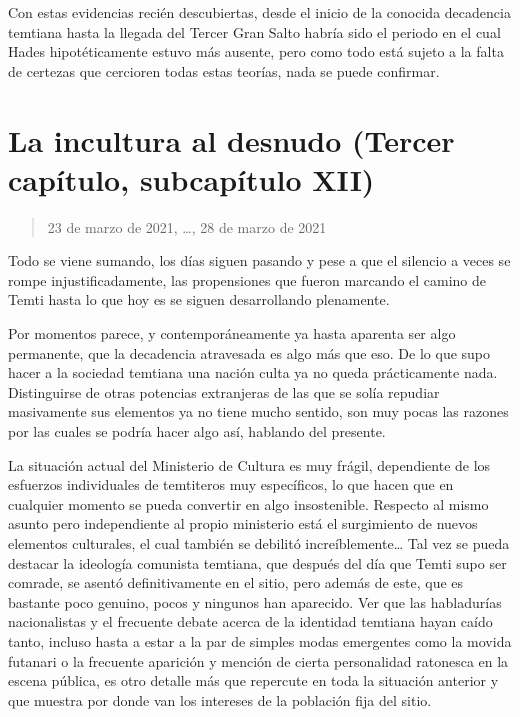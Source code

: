 \documentclass[
  spanish,
]{book}
\begin{document}
Con estas evidencias recién descubiertas, desde el inicio de la conocida decadencia temtiana hasta la llegada del Tercer Gran Salto habría sido el periodo en el cual Hades hipotéticamente estuvo más ausente, pero como todo está sujeto a la falta de certezas que cercioren todas estas teorías, nada se puede confirmar.

\hypertarget{la-incultura-al-desnudo-tercer-capuxedtulo-subcapuxedtulo-xii}{%
\section{La incultura al desnudo (Tercer capítulo, subcapítulo XII)}\label{la-incultura-al-desnudo-tercer-capuxedtulo-subcapuxedtulo-xii}}

\begin{quote}
23 de marzo de 2021, \ldots, 28 de marzo de 2021
\end{quote}

Todo se viene sumando, los días siguen pasando y pese a que el silencio a veces se rompe injustificadamente, las propensiones que fueron marcando el camino de Temti hasta lo que hoy es se siguen desarrollando plenamente.

Por momentos parece, y contemporáneamente ya hasta aparenta ser algo permanente, que la decadencia atravesada es algo más que eso. De lo que supo hacer a la sociedad temtiana una nación culta ya no queda prácticamente nada. Distinguirse de otras potencias extranjeras de las que se solía repudiar masivamente sus elementos ya no tiene mucho sentido, son muy pocas las razones por las cuales se podría hacer algo así, hablando del presente.

La situación actual del Ministerio de Cultura es muy frágil, dependiente de los esfuerzos individuales de temtiteros muy específicos, lo que hacen que en cualquier momento se pueda convertir en algo insostenible. Respecto al mismo asunto pero independiente al propio ministerio está el surgimiento de nuevos elementos culturales, el cual también se debilitó increíblemente\ldots{} Tal vez se pueda destacar la ideología comunista temtiana, que después del día que Temti supo ser comrade, se asentó definitivamente en el sitio, pero además de este, que es bastante poco genuino, pocos y ningunos han aparecido. Ver que las habladurías nacionalistas y el frecuente debate acerca de la identidad temtiana hayan caído tanto, incluso hasta a estar a la par de simples modas emergentes como la movida futanari o la frecuente aparición y mención de cierta personalidad ratonesca en la escena pública, es otro detalle más que repercute en toda la situación anterior y que muestra por donde van los intereses de la población fija del sitio.
\end{document}
